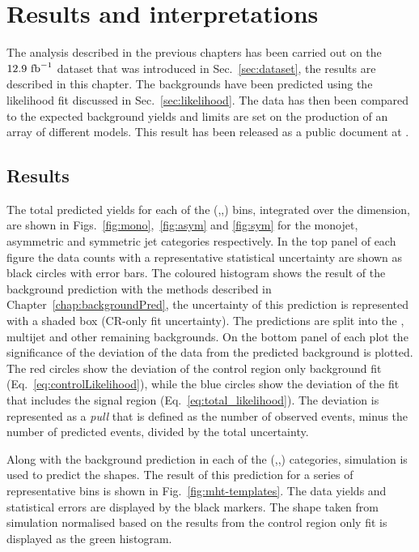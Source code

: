 \chapter{Results and interpretations}
\label{chap:results}

The analysis described in the previous chapters has been carried out
on the $12.9~\text{fb}^{-1}$ dataset that was introduced in
Sec.~\ref{sec:dataset}, the results are described in this chapter. The
\SM backgrounds have been predicted using the likelihood fit discussed
in Sec.~\ref{sec:likelihood}. The data has then been compared to the expected
background yields and limits are set on the production of an array of
different \SUSY models. This result has been released as a public document at \cite{CMS-PAS-SUS-16-016}.

\section{Results}

The total predicted \SM yields for each of the (\HT,\nj,\nb) bins,
integrated over the \MHT dimension, are shown in
Figs.~\ref{fig:mono},~\ref{fig:asym} and \ref{fig:sym} for the
monojet, asymmetric and symmetric jet categories respectively. In the
top panel of each figure the data counts with a representative
statistical uncertainty are shown as black circles with error bars.
The coloured histogram shows the result of the \SM background
prediction with the \TF methods described in
Chapter~\ref{chap:backgroundPred}, the uncertainty of this prediction
is represented with a shaded box (CR-only fit uncertainty). The
predictions are split into the \znunu, \QCD multijet and other
remaining \SM backgrounds. On the bottom panel of each plot the
significance of the deviation of the data from the predicted \SM
background is plotted. The red circles show the deviation of the
control region only background fit (Eq.~\ref{eq:controlLikelihood}),
while the blue circles show the deviation of the fit that includes the
signal region (Eq.~\ref{eq:total_likelihood}). The deviation is
represented as a \emph{pull} that is defined as the number of observed
events, minus the number of predicted events, divided by the total
uncertainty.

Along with the background prediction in each of the (\HT,\nj,\nb)
categories, simulation is used to predict the \MHT shapes. The result
of this prediction for a series of representative bins is shown in
Fig.~\ref{fig:mht-templates}. The data yields and statistical errors
are displayed by the black markers. The \MHT shape taken from
simulation normalised based on the results from the control region
only fit is displayed as the green histogram.

